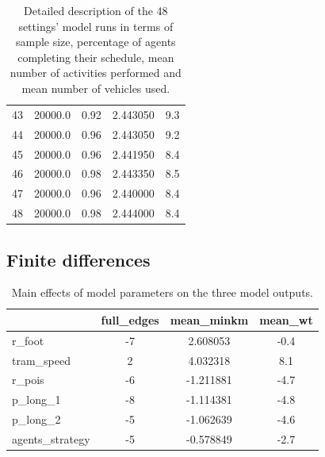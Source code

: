 \begin{table}
{\begin{tabular}{lcccc}
43  &      20000.0 &        0.92 &           2.443050 &              9.3 \\
44  &      20000.0 &        0.96 &           2.443050 &              9.2 \\
45  &      20000.0 &        0.96 &           2.441950 &              8.4 \\
46  &      20000.0 &        0.98 &           2.443350 &              8.5 \\
47  &      20000.0 &        0.96 &           2.440000 &              8.4 \\
48  &      20000.0 &        0.98 &           2.444000 &              8.4 \\
\bottomrule
\end{tabular}}
    \caption{Detailed description of the 48 settings' model runs in terms of sample size, percentage of agents completing their schedule, mean number of activities performed and mean number of vehicles used.}
    \label{tab:runs_tot}
\end{table}


\subsection*{Finite differences} \label{app:fd}

\begin{table}[H]
    \raggedright
\scriptsize{
\begin{tabular}{lccc}
\toprule
{} &  full\_edges &  mean\_minkm &  mean\_wt \\
\midrule
r\_foot          &          -7 &    2.608053 &                  -0.4 \\
tram\_speed      &           2 &    4.032318 &                   8.1 \\
r\_pois          &          -6 &   -1.211881 &                  -4.7 \\
p\_long\_1        &          -8 &   -1.114381 &                  -4.8 \\
p\_long\_2        &          -5 &   -1.062639 &                  -4.6 \\
agents\_strategy &          -5 &   -0.578849 &                  -2.7 \\
\bottomrule
\end{tabular}}
    \caption{Main effects of model parameters on the three model outputs.}
    \label{tab:main_effects}
\end{table}


